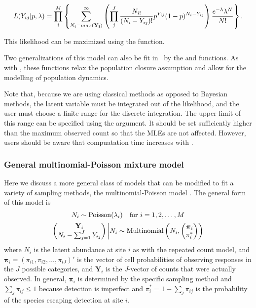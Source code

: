 \documentclass[article,shortnames]{jss}
\DeclareMathOperator{\Poi}{Poisson}
\DeclareMathOperator{\MN}{Multinomial}
\newcommand{\um}{\pkg{unmarked}}
\begin{document}
\begin{equation}
L(Y_{ij}| p,\lambda) = 
 \prod_{i}^{M} 
 \left\{ \sum_{N_{i}=max({\bf Y_i})}^{\infty}
          \left( \prod_{j}^{J} 
     \frac{N_{i!}}{ (N_{i}-Y_{ij})!} p^{Y_{ij}}(1-p)^{N_{i}-Y_{ij}} \right)
       \frac{e^{-\lambda} \lambda^N}{N!} \right\}.
\end{equation}

This likelihood can be maximized using the  function.  

Two generalizations of this model can also be fit in \um\ by the 
 and  functions.  As with ,
these functions relax the population closure assumption and allow for 
the modelling of population dynamics.

Note that,
because we are using classical methods as opposed to Bayesian methods, 
the latent variable  must be integrated out of the likelihood, and the
user must choose a finite range for the discrete integration. The upper 
limit of this range can be specified using the  argument.  It should
be set sufficiently higher than the maximum observed count so that the 
MLEs are not affected.  However, users should be aware that compuatation 
time increases with .



     
\subsubsection{General multinomial-Poisson mixture model}
\label{sec:gener-mult-poiss}
Here we discuss a more general class of models that can be modified to fit a
variety of sampling methods, the multinomial-Poisson model
\citep{Royle2004a}.   The general form of this model is
\begin{gather}
\label{eq:mp2}
  N_i \sim \Poi(\lambda_i) \text{\quad for $i=1,2,\dots,M$}  \notag \\
  \begin{pmatrix}
    \mathbf Y_i\\
    N_{i} - \sum_{j=1}^{J} Y_{ij}
   \end{pmatrix}
  \bigg| N_{i} \sim \MN\left(N_i, 
  \begin{pmatrix}
    \boldsymbol \pi_i \\
    \pi_{i}^{*} 
  \end{pmatrix}\right) \notag
\end{gather}
where $N_i$ is the latent abundance at site $i$ as with the repeated
count model, and $\boldsymbol \pi_i=(\pi_{i1},\pi_{i2},\dots,\pi_{iJ})'$ is
the vector of cell probabilities of observing responses in the $J$
possible categories, and $\mathbf Y_{i}$ is the $J$-vector of counts
that were actually observed.  In general, $\boldsymbol \pi_i$ is
determined by the specific sampling method and
$\sum_{j} \pi_{ij} \le 1$ because detection is imperfect and
$\pi_{i}^{*}=1 - \sum_{j} \pi_{ij}$  is the probability of the species
escaping detection at site $i$.  
\end{document}
